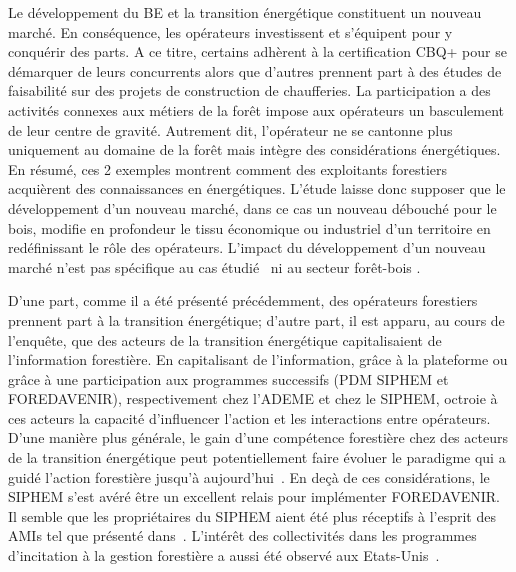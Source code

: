 \documentclass[12pt]{report}
\newcommand\indexp[1]{#1\index{#1}}
\begin{document}
Le développement du BE et la transition énergétique constituent un nouveau marché.
En conséquence, les opérateurs investissent et s'équipent pour y conquérir des
parts. A ce titre, certains adhèrent à la certification CBQ+ pour se démarquer
de leurs concurrents alors que d'autres prennent part  à des études de faisabilité
sur des projets de construction de chaufferies.
La participation a des activités connexes aux métiers de la forêt impose aux
opérateurs un basculement de leur centre de gravité. Autrement dit, l'opérateur
ne se cantonne plus uniquement
au domaine de la forêt mais intègre des considérations énergétiques. En résumé,
ces 2 exemples montrent comment des exploitants forestiers acquièrent des
connaissances en énergétiques. L'étude laisse donc supposer que le développement
d'un nouveau marché, dans ce cas un nouveau débouché pour le bois, modifie en
profondeur le tissu économique ou industriel d'un territoire en redéfinissant le
rôle des opérateurs. L'impact du développement d'un nouveau marché n'est pas
spécifique au cas étudié~\citep{sergent2014_ref110} ni au secteur forêt-bois
\citep{castaneda2017_ref111}.

D'une part, comme il a été présenté précédemment, des opérateurs forestiers
prennent part à la transition énergétique; d'autre part, il est apparu, au cours
de l'enquête, que des acteurs de la transition énergétique capitalisaient de
l'information forestière. En capitalisant de l'information, grâce à la plateforme
ou grâce à une participation aux programmes successifs (\indexp{PDM} SIPHEM et
FOREDAVENIR), respectivement chez l'ADEME et chez le SIPHEM, octroie à ces acteurs
la capacité d'influencer l'action et les interactions entre opérateurs. D'une
manière plus générale, le gain d'une compétence forestière chez des acteurs de
la transition énergétique peut potentiellement faire évoluer le paradigme qui a
guidé l'action forestière jusqu'à aujourd'hui~\citep{sergent2014_ref110}. En
deçà de ces considérations, le SIPHEM s'est avéré être un excellent relais pour
implémenter FOREDAVENIR. Il semble que les propriétaires du SIPHEM aient été
plus réceptifs à l'esprit des AMIs tel que présenté dans~\citet{instructionTech_ref109}.
L'intérêt des collectivités dans les programmes d'incitation à la gestion forestière
a aussi été observé aux Etats-Unis~\citep{rouleau2016_ref100}.
\end{document}
